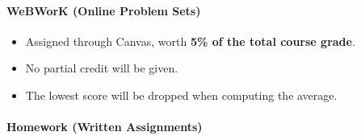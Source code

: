 \paragraph*{WeBWorK (Online Problem Sets)}
\begin{itemize}
    \item Assigned through Canvas, worth \textbf{5\% of the total course grade}.
    \item No partial credit will be given.
    \item The lowest score will be dropped when computing the average.
\end{itemize}

\paragraph*{Homework (Written Assignments)}
